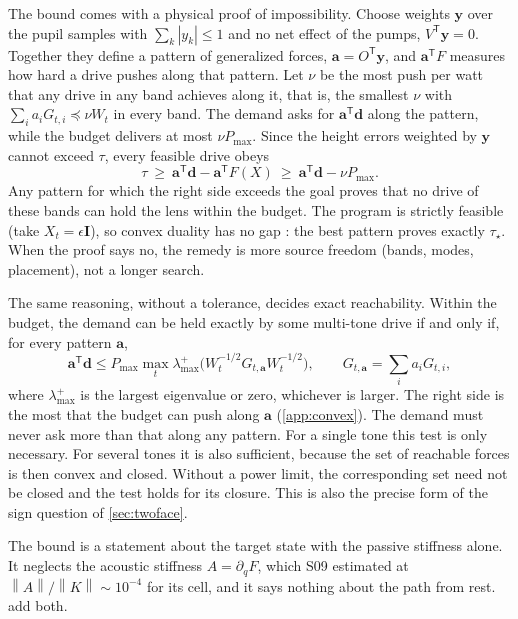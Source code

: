 \documentclass[11pt,a4paper]{article}
\numberwithin{equation}{section}
\newcommand{\Id}{\bm I}
\newcommand{\norm}[1]{\left\lVert#1\right\rVert}
\begin{document}
The bound comes with a physical proof of impossibility. Choose weights $\bm y$
over the pupil samples with $\sum_k|y_k|\le1$ and no net effect of the pumps,
$V^{\mathsf T}\bm y=0$. Together they define a pattern of generalized forces,
$\bm a=O^{\mathsf T}\bm y$, and $\bm a^{\mathsf T}F$ measures how hard a drive
pushes along that pattern. Let $\nu$ be the most push per watt that any drive
in any band achieves along it, that is, the smallest $\nu$ with
$\sum_ia_iG_{t,i}\preceq\nu W_t$ in every band. The demand asks for
$\bm a^{\mathsf T}\bm d$ along the pattern, while the budget delivers at most
$\nu P_{\max}$. Since the height errors weighted by $\bm y$ cannot exceed
$\tau$, every feasible drive obeys
\begin{equation}
 \tau\ \ge\ \bm a^{\mathsf T}\bm d-\bm a^{\mathsf T}F(X)
 \ \ge\ \bm a^{\mathsf T}\bm d-\nu P_{\max}.
 \label{eq:dual}
\end{equation}
Any pattern for which the right side exceeds the goal proves that no drive of
these bands can hold the lens within the budget. The program is strictly
feasible (take $X_t=\epsilon\Id$), so convex duality has no gap
\cite{vandenberghe1996}: the best pattern proves exactly $\tau_\star$. When the
proof says no, the remedy is more source freedom (bands, modes, placement), not
a longer search.

The same reasoning, without a tolerance, decides exact reachability. Within the
budget, the demand can be held exactly by some multi-tone drive if and only if,
for every pattern $\bm a$,
\begin{equation}
 \bm a^{\mathsf T}\bm d\le P_{\max}\max_t\lambda_{\max}^+\bigl(
   W_t^{-1/2}G_{t,\bm a}W_t^{-1/2}\bigr),\qquad G_{t,\bm a}=\sum_ia_iG_{t,i},
 \label{eq:support}
\end{equation}
where $\lambda_{\max}^+$ is the largest eigenvalue or zero, whichever is larger.
The right side is the most that the budget can push along $\bm a$
(\cref{app:convex}). The demand must never ask more than that along any
pattern. For a single tone this test is only necessary. For several tones it is
also sufficient, because the set of reachable forces is then convex and closed.
Without a power limit, the corresponding set need not be closed and the test
holds for its closure. This is also the precise form of the sign question of
\cref{sec:twoface}.

The bound is a statement about the target state with the passive stiffness
alone. It neglects the acoustic stiffness $A=\partial_qF$, which S09 estimated
at $\norm A/\norm K\sim10^{-4}$ for its cell, and it says nothing about the path
from rest.  add both.
\end{document}
